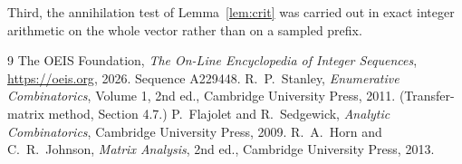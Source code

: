 \documentclass[11pt,a4paper]{article}
\theoremstyle{plain}
\theoremstyle{definition}
\begin{document}
Third, the annihilation test of Lemma~\ref{lem:crit} was carried out in exact integer
arithmetic on the whole vector rather than on a sampled prefix.

\begin{thebibliography}{9}
 The OEIS Foundation, \emph{The On-Line Encyclopedia of Integer
Sequences}, \url{https://oeis.org}, 2026. Sequence A229448.
 R.~P.~Stanley, \emph{Enumerative Combinatorics}, Volume 1, 2nd ed.,
Cambridge University Press, 2011. (Transfer-matrix method, Section 4.7.)
 P.~Flajolet and R.~Sedgewick, \emph{Analytic Combinatorics}, Cambridge
University Press, 2009.
 R.~A.~Horn and C.~R.~Johnson, \emph{Matrix Analysis}, 2nd ed., Cambridge
University Press, 2013.
\end{thebibliography}
\end{document}
